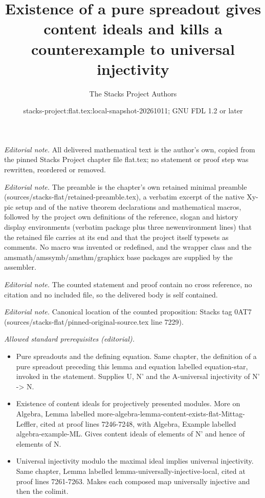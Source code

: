 \documentclass[10pt,a4paper]{amsart}
\title{Existence of a pure spreadout gives content ideals and kills a counterexample to universal injectivity}
\author{The Stacks Project Authors}
\date{stacks-project:flat.tex:local-snapshot-20261011; GNU FDL 1.2 or later}
\theoremstyle{plain}
\theoremstyle{definition}
\theoremstyle{remark}
\numberwithin{equation}{subsection}
\begin{document}
\maketitle
\noindent\textit{Editorial note.} All delivered mathematical text is the author's own, copied from the pinned Stacks Project chapter file flat.tex; no statement or proof step was rewritten, reordered or removed.\par\medskip
\noindent\textit{Editorial note.} The preamble is the chapter's own retained minimal preamble (sources/stacks-flat/retained-preamble.tex), a verbatim excerpt of the native Xy-pic setup and of the native theorem declarations and mathematical macros, followed by the project own definitions of the reference, slogan and history display environments (verbatim package plus three newenvironment lines) that the retained file carries at its end and that the project itself typesets as comments. No macro was invented or redefined, and the wrapper class and the amsmath/amssymb/amsthm/graphicx base packages are supplied by the assembler.\par\medskip
\noindent\textit{Editorial note.} The counted statement and proof contain no cross reference, no citation and no included file, so the delivered body is self contained.\par\medskip
\noindent\textit{Editorial note.} Canonical location of the counted proposition: Stacks tag 0AT7 (sources/stacks-flat/pinned-original-source.tex line 7229).\par\medskip
\noindent\textit{Allowed standard prerequisites (editorial).}\begin{itemize}
\item Pure spreadouts and the defining equation. Same chapter, the definition of a pure spreadout preceding this lemma and equation labelled equation-star, invoked in the statement. Supplies U, N' and the A-universal injectivity of N' -> N.
\item Existence of content ideals for projectively presented modules. More on Algebra, Lemma labelled more-algebra-lemma-content-exists-flat-Mittag-Leffler, cited at proof lines 7246-7248, with Algebra, Example labelled algebra-example-ML. Gives content ideals of elements of N' and hence of elements of N.
\item Universal injectivity modulo the maximal ideal implies universal injectivity. Same chapter, Lemma labelled lemma-universally-injective-local, cited at proof lines 7261-7263. Makes each composed map universally injective and then the colimit.
\end{itemize}\medskip
\end{document}
